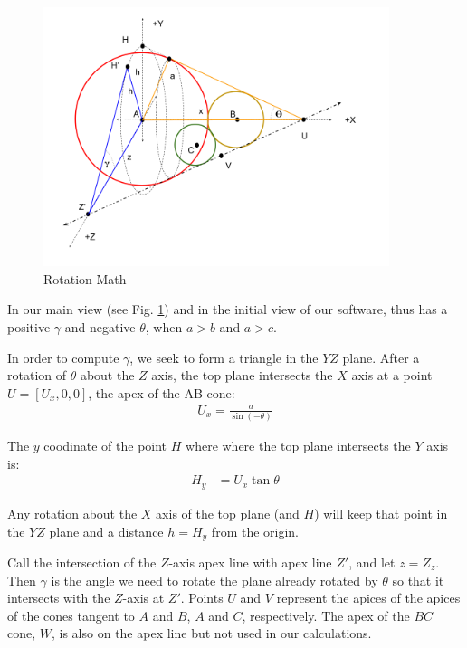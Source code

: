 \documentclass{article}
\begin{document}
\begin{figure}
     \centering
     \includegraphics[width=0.9\textwidth]{figures/RotationMathII.png}
     \caption{Rotation Math}
  \label{fig:rotation}
\end{figure}

In our main view (see Fig. \ref{fig:rotation}) and in the initial view
of our software, thus has a positive $\gamma$ and negative $\theta$, when $a > b$ and $a > c$.

In order to compute $\gamma$, we seek to form a triangle in the $YZ$ plane.
After a rotation of $\theta$ about the $Z$ axis, the top plane intersects the $X$ axis
at a point $U = [U_x,0,0]$, the apex of the AB cone:
\begin{align}
  U_x = \frac{a}{\sin{(-\theta)}}
\end{align}

The $y$ coodinate of the point $H$ where where the top plane intersects
the $Y$ axis is:
\begin{align}
  H_y &= U_x \tan{\theta}
\end{align}

Any rotation about the $X$ axis of the top plane (and $H$) will keep that
point in the $YZ$ plane and a distance $ h = H_y$ from the origin.

Call the intersection
of the $Z$-axis apex line with apex line $Z'$, and let $z = Z_z$.
Then $\gamma$ is the angle we need to rotate the plane already rotated by $\theta$ so that it intersects with the
$Z$-axis at $Z'$.
Points $U$ and $V$ represent the apices of the apices of the cones tangent to $A$ and $B$, $A$ and $C$, respectively.
The apex of the $BC$ cone, $W$, is also on the apex line but not used in our calculations.
\end{document}
